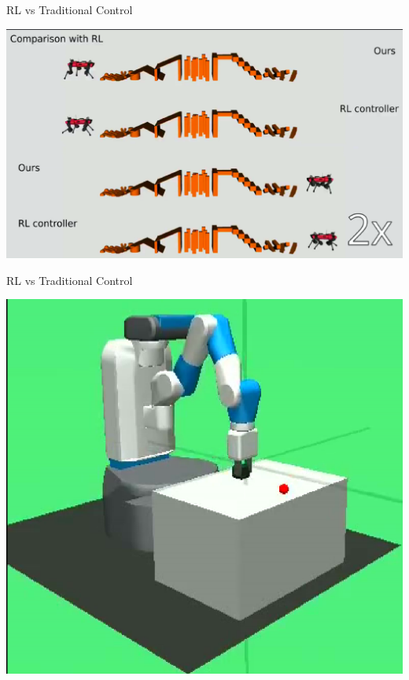 \begin{frame}{RL vs Traditional Control}

    \begin{center}
        \href{run:../img/mpc-compressed.mp4}{
        \includegraphics[scale=0.20]
        {img/mpc-thumb.png}
        }
    \end{center}

\end{frame}

\begin{frame}{RL vs Traditional Control}
    \begin{center}
        \href{run:../img/fetch.mp4}{
        \includegraphics[scale=0.30]
        {img/fetch.png}
        }
    \end{center}
\end{frame}

